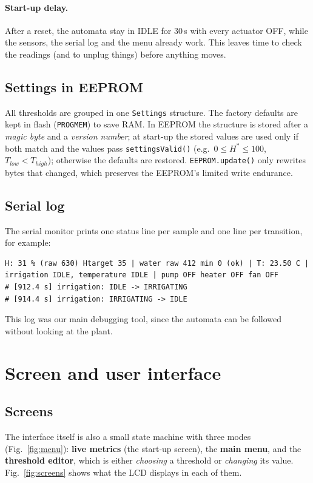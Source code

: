 \documentclass[10pt,a4paper,twocolumn]{article}
\newcommand{\code}[1]{\texttt{#1}}
\begin{document}
\paragraph{Start-up delay.} After a reset, the automata stay in IDLE for 30\,s with
every actuator OFF, while the sensors, the serial log and the menu already work. This
leaves time to check the readings (and to unplug things) before anything moves.

\subsection{Settings in EEPROM}
All thresholds are grouped in one \code{Settings} structure. The factory defaults are
kept in flash (\code{PROGMEM}) to save RAM. In EEPROM the structure is stored after a
\emph{magic byte} and a \emph{version number}; at start-up the stored values are used
only if both match and the values pass \code{settingsValid()} (e.g.\ $0\le H^*\le100$,
$T_{low}<T_{high}$); otherwise the defaults are restored. \code{EEPROM.update()} only
rewrites bytes that changed, which preserves the EEPROM's limited write endurance.

\subsection{Serial log}
The serial monitor prints one status line per sample and one line per transition,
for example:
\begin{lstlisting}[language={}]
H: 31 % (raw 630) Htarget 35 | water raw 412 min 0 (ok) | T: 23.50 C | irrigation IDLE, temperature IDLE | pump OFF heater OFF fan OFF
# [912.4 s] irrigation: IDLE -> IRRIGATING
# [914.4 s] irrigation: IRRIGATING -> IDLE
\end{lstlisting}
This log was our main debugging tool, since the automata can be followed without
looking at the plant.

\section{Screen and user interface}\label{sec:screen}

\subsection{Screens}
The interface itself is also a small state machine with three modes
(Fig.~\ref{fig:menu}): \textbf{live metrics} (the start-up screen), the \textbf{main
menu}, and the \textbf{threshold editor}, which is either \emph{choosing} a threshold
or \emph{changing} its value. Fig.~\ref{fig:screens} shows what the LCD displays in
each of them.
\end{document}

